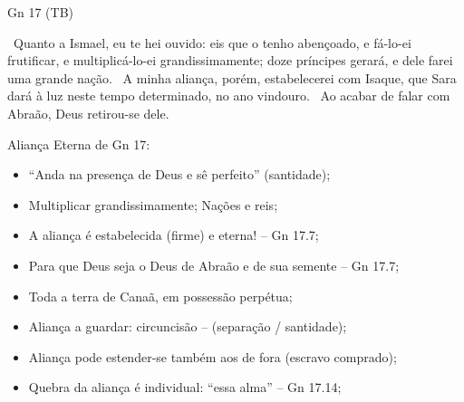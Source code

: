 \documentclass[12pt,aspectratio=169]{beamer}
\newcommand{\ver}[1]{%
    \raisebox{0.50ex}{%
        \scalebox{1.1}{%
            \pmb{\textbf{\textcolor{BSpbg}{#1}}}%
        }%
    }%
}
\newcommand{\QUOTE}[1]{%
    \par\noindent\hspace*{0.05\linewidth}%
    \begin{minipage}{0.9\linewidth}%
        \linespread{1.35}\large{#1}%
    \end{minipage}%
}
\newcommand{\RED}[1]{{\textcolor{TXred}{#1}}}
\newcommand{\ORA}[1]{{\textcolor{TXred!50!TXyel}{#1}}}
\newcommand{\YEL}[1]{{\textcolor{TXyel}{#1}}}
\newcommand{\GRE}[1]{{\textcolor{TXgre}{#1}}}
\newcommand{\CYA}[1]{{\textcolor{TXcya}{#1}}}
\newcommand{\BLU}[1]{{\textcolor{TXblu}{#1}}}
\newcommand{\MAG}[1]{{\textcolor{TXmag}{#1}}}
\newcommand{\BRI}[1]{{\textcolor{BSpbg}{#1}}}   %
\begin{document}
    \begin{frame}{\BRI{Gn 17} (TB)}
        \QUOTE{%
            \ver{20}~Quanto a Ismael, eu te hei ouvido: eis que o tenho abençoado, e fá-lo-ei
            frutificar, e multiplicá-lo-ei grandissimamente; doze príncipes gerará, e dele farei
            uma grande nação.
            \ver{21}~\YEL{A minha aliança, porém, estabelecerei com Isaque}, que Sara dará à luz
            neste tempo determinado, no ano vindouro.
            \ver{22}~Ao acabar de falar com Abraão, Deus retirou-se dele.
        }
    \end{frame}

    \begin{frame}{\YEL{Aliança Eterna} de \BRI{Gn 17}:}
        \begin{itemize}
            \item<1-> ``\MAG{Anda na presença} de Deus e \MAG{sê perfeito}'' (santidade);
            \item<2-> Multiplicar \YEL{grandissimamente}; Nações e \GRE{reis};
            \item<3-> A aliança é \YEL{estabelecida} (firme) e \CYA{eterna!} -- Gn 17.7;
            \item<4-> Para que \BLU{Deus seja o Deus de Abraão e de sua semente} -- Gn 17.7;
            \item<5-> Toda a \YEL{terra} de Canaã, em \GRE{possessão} \YEL{perpétua};
            \item<6-> Aliança a guardar: \MAG{circuncisão} -- (separação / santidade);
            \item<7-> Aliança pode estender-se também \ORA{aos de fora} (escravo comprado);
            \item<8-> \RED{Quebra} da aliança é \YEL{individual}: ``\YEL{essa alma}'' -- Gn
                17.14;
        \end{itemize}
    \end{frame}
\end{document}
